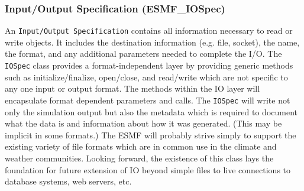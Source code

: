 \subsubsection{Input/Output Specification (ESMF\_IOSpec)}
\label{sec:iospec} 
An {\tt Input/Output Specification} contains all 
information necessary to read or write objects.  It includes the 
destination information (e.g. file, socket), the name,
the format, and any additional parameters needed to complete the I/O.
The {\tt IOSpec} class provides a format-independent layer by
providing generic methods such as initialize/finalize, open/close, 
and read/write which are not specific to any one input or output format.
The methods
within the IO layer will encapsulate format dependent parameters and calls.
The {\tt IOSpec} will write not only the simulation output 
but also the metadata which is required to document what the data is
and information about how it was generated.  (This may be implicit in
some formats.)
The ESMF will probably strive simply to
support the existing variety of file formats which are in common use in
the climate and weather communities.  Looking forward,
the existence of this class lays the foundation for future extension 
of IO beyond simple files to live connections to database systems, 
web servers, etc.





